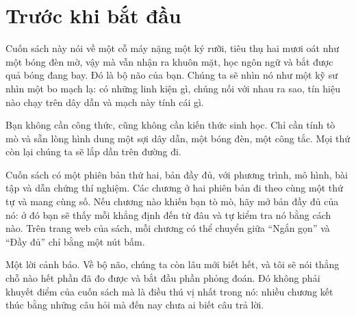 \chapter*{Trước khi bắt đầu}

Cuốn sách này nói về một cỗ máy nặng một ký rưỡi, tiêu thụ hai mươi oát như một bóng đèn mờ, vậy mà vẫn nhận ra khuôn mặt, học ngôn ngữ và bắt được quả bóng đang bay. Đó là bộ não của bạn. Chúng ta sẽ nhìn nó như một kỹ sư nhìn một bo mạch lạ: có những linh kiện gì, chúng nối với nhau ra sao, tín hiệu nào chạy trên dây dẫn và mạch này tính cái gì.

Bạn không cần công thức, cũng không cần kiến thức sinh học. Chỉ cần tính tò mò và sẵn lòng hình dung một sợi dây dẫn, một bóng đèn, một công tắc. Mọi thứ còn lại chúng ta sẽ lắp dần trên đường đi.

Cuốn sách có một phiên bản thứ hai, bản đầy đủ, với phương trình, mô hình, bài tập và dẫn chứng thí nghiệm. Các chương ở hai phiên bản đi theo cùng một thứ tự và mang cùng số. Nếu chương nào khiến bạn tò mò, hãy mở bản đầy đủ của nó: ở đó bạn sẽ thấy mỗi khẳng định đến từ đâu và tự kiểm tra nó bằng cách nào. Trên trang web của sách, mỗi chương có thể chuyển giữa ``Ngắn gọn'' và ``Đầy đủ'' chỉ bằng một nút bấm.

Một lời cảnh báo. Về bộ não, chúng ta còn lâu mới biết hết, và tôi sẽ nói thẳng chỗ nào hết phần đã đo được và bắt đầu phần phỏng đoán. Đó không phải khuyết điểm của cuốn sách mà là điều thú vị nhất trong nó: nhiều chương kết thúc bằng những câu hỏi mà đến nay chưa ai biết câu trả lời.
